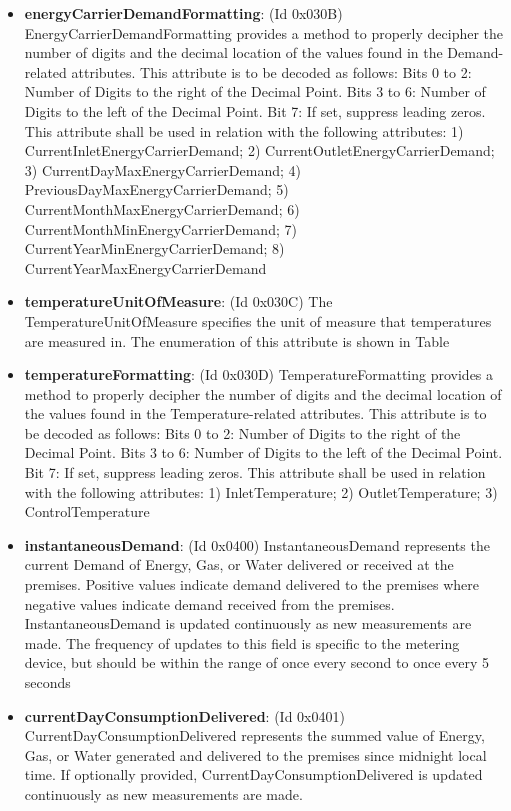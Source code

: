 \begin{itemize}
\item \textbf{energyCarrierDemandFormatting}: (Id 0x030B) EnergyCarrierDemandFormatting provides a method to properly decipher the number of digits and the decimal location of the values found in the Demand-related attributes. This attribute is to be decoded as follows: Bits 0 to 2: Number of Digits to the right of the Decimal Point. Bits 3 to 6: Number of Digits to the left of the Decimal Point. Bit 7: If set, suppress leading zeros. This attribute shall be used in relation with the following attributes: 1) CurrentInletEnergyCarrierDemand; 2) CurrentOutletEnergyCarrierDemand; 3) CurrentDayMaxEnergyCarrierDemand; 4) PreviousDayMaxEnergyCarrierDemand; 5) CurrentMonthMaxEnergyCarrierDemand; 6) CurrentMonthMinEnergyCarrierDemand; 7) CurrentYearMinEnergyCarrierDemand; 8) CurrentYearMaxEnergyCarrierDemand
\item \textbf{temperatureUnitOfMeasure}: (Id 0x030C) The TemperatureUnitOfMeasure specifies the unit of measure that temperatures are measured in. The enumeration of this attribute is shown in Table
\item \textbf{temperatureFormatting}: (Id 0x030D) TemperatureFormatting provides a method to properly decipher the number of digits and the decimal location of the values found in the Temperature-related attributes. This attribute is to be decoded as follows: Bits 0 to 2: Number of Digits to the right of the Decimal Point. Bits 3 to 6: Number of Digits to the left of the Decimal Point. Bit 7: If set, suppress leading zeros. This attribute shall be used in relation with the following attributes: 1) InletTemperature; 2) OutletTemperature; 3) ControlTemperature
\item \textbf{instantaneousDemand}: (Id 0x0400) InstantaneousDemand represents the current Demand of Energy, Gas, or Water delivered or received at the premises. Positive values indicate demand delivered to the premises where negative values indicate demand received from the premises. InstantaneousDemand is updated continuously as new measurements are made. The frequency of updates to this field is specific to the metering device, but should be within the range of once every second to once every 5 seconds
\item \textbf{currentDayConsumptionDelivered}: (Id 0x0401) CurrentDayConsumptionDelivered represents the summed value of Energy, Gas, or Water generated and delivered to the premises since midnight local time. If optionally provided, CurrentDayConsumptionDelivered is updated continuously as new measurements are made.

\end{itemize}
